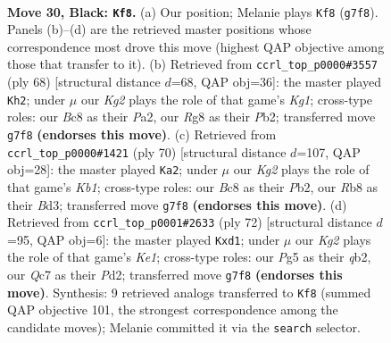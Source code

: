 \documentclass[11pt]{article}
\begin{document}
\clearpage

\begin{figure}[p]\centering
\begin{subfigure}{0.46\textwidth}\centering
\resizebox{\linewidth}{!}{%
\newchessgame
\chessboard[
  setfen={1rb3r1/p1q2pk1/2p1p2p/2P3p1/8/3B4/P7/1R1KR3 b - - 1 30},
  showmover=false,
  pgfstyle=straightmove, color=movearrow, markmove={g7-f8}
]}
\caption{}
\end{subfigure}\hfill
\begin{subfigure}{0.46\textwidth}\centering
\resizebox{\linewidth}{!}{%
\newchessgame
\chessboard[
  setfen={3r3k/5p2/7q/pp2P3/4QP1b/3B1R1P/PP4P1/6K1 w - - 9 35},
  showmover=false,
  pgfstyle=straightmove, color=movearrow, markmove={g1-h2}
]}
\caption{}
\end{subfigure}
\\[4pt]
\begin{subfigure}{0.46\textwidth}\centering
\resizebox{\linewidth}{!}{%
\newchessgame
\chessboard[
  setfen={2r5/3k4/p3p3/1pbpP3/7q/PR1B4/1PP1Q3/1K6 w - - 9 36},
  showmover=false,
  pgfstyle=straightmove, color=movearrow, markmove={b1-a2}
]}
\caption{}
\end{subfigure}\hfill
\begin{subfigure}{0.46\textwidth}\centering
\resizebox{\linewidth}{!}{%
\newchessgame
\chessboard[
  setfen={5rk1/7p/p5r1/4P3/P6Q/2R4P/1qPP1B2/3bK3 w - - 0 37},
  showmover=false,
  pgfstyle=straightmove, color=movearrow, markmove={e1-d1}
]}
\caption{}
\end{subfigure}
\caption{\textbf{Move 30, Black: \texttt{Kf8}.} (a) Our position; Melanie plays \texttt{Kf8} (\texttt{g7f8}). Panels (b)--(d) are the retrieved master positions whose correspondence most drove this move (highest QAP objective among those that transfer to it). (b) Retrieved from \texttt{ccrl\_top\_p0000\#3557} (ply 68) [structural distance $d$=68, QAP obj=36]: the master played \texttt{Kh2}; under $\mu$ our \emph{Kg2} plays the role of that game's \emph{Kg1}; cross-type roles: our \emph{B}c8 as their \emph{P}a2, our \emph{R}g8 as their \emph{P}b2; transferred move \texttt{g7f8} \textbf{(endorses this move)}. (c) Retrieved from \texttt{ccrl\_top\_p0000\#1421} (ply 70) [structural distance $d$=107, QAP obj=28]: the master played \texttt{Ka2}; under $\mu$ our \emph{Kg2} plays the role of that game's \emph{Kb1}; cross-type roles: our \emph{B}c8 as their \emph{P}b2, our \emph{R}b8 as their \emph{B}d3; transferred move \texttt{g7f8} \textbf{(endorses this move)}. (d) Retrieved from \texttt{ccrl\_top\_p0001\#2633} (ply 72) [structural distance $d$=95, QAP obj=6]: the master played \texttt{Kxd1}; under $\mu$ our \emph{Kg2} plays the role of that game's \emph{Ke1}; cross-type roles: our \emph{P}g5 as their \emph{q}b2, our \emph{Q}c7 as their \emph{P}d2; transferred move \texttt{g7f8} \textbf{(endorses this move)}. Synthesis: 9 retrieved analogs transferred to \texttt{Kf8} (summed QAP objective 101, the strongest correspondence among the candidate moves); Melanie committed it via the \texttt{search} selector.}
\label{fig:thought-m59}
\end{figure}
\end{document}
